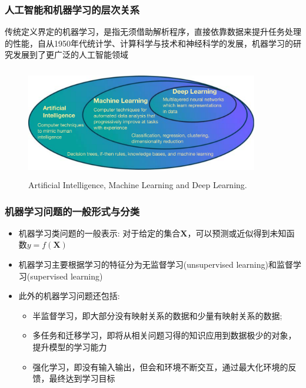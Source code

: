 {{\frame
{
	\frametitle{人工智能和机器学习的层次关系}
	传统定义界定的机器学习，是指无须借助解析程序，直接依靠数据来提升任务处理的性能，自从\textrm{1950}年代统计学、计算科学与技术和神经科学的发展，机器学习的研究发展到了更广泛的人工智能领域%
\begin{figure}[h!]
\centering
\vspace*{-0.1in}
\includegraphics[height=1.9in,width=4.0in,viewport=0 0 1275 550,clip]{Figures/Hierarchical_description_AI_ML_DL.png}
\caption{\tiny{\textrm{Artificial Intelligence, Machine Learning and Deep Learning.}}}%
\label{AI-ML}
\end{figure}
}

\frame
{
	\frametitle{机器学习问题的一般形式与分类}
	\begin{itemize}
		\item 机器学习类问题的一般表示:
\vskip 5pt
对于给定的集合$\mathbf{X}$，可以预测或近似得到未知函数$y=f(\mathbf{X})$
\vskip 4pt
{\fontsize{6.2pt}{4.2pt}}
\vskip 5pt
	\textcolor{blue}{\fontsize{8.0pt}{4.2pt}}
\item 机器学习主要根据学习的特征分为无监督学习\textrm{(unsupervised learning)}和监督学习\textrm{(supervised learning)}
	\item 此外的机器学习问题还包括:~
\begin{itemize}
	\item 半监督学习，即大部分没有映射关系的数据和少量有映射关系的数据;
	\item 多任务和迁移学习，即将从相关问题习得的知识应用到数据极少的对象，提升模型的学习能力
	\item 强化学习，即没有输入输出，但会和环境不断交互，通过最大化环境的反馈，最终达到学习目标
\end{itemize}
	\end{itemize}
}

}}
